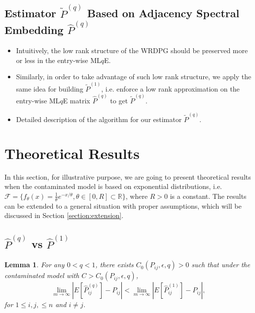 \documentclass[a4paper]{article}
\newtheorem{lemma}[fact]{Lemma}
\renewcommand{\hat}{\widehat}
\begin{document}
\subsection{Estimator $\widetilde{P}^{(q)}$ Based on Adjacency Spectral Embedding $\hat{P}^{(q)}$}
\begin{itemize}
\item Intuitively, the low rank structure of the WRDPG should be preserved more or less in the entry-wise ML$q$E.
\item Similarly, in order to take advantage of such low rank structure, we apply the same idea for building $\widetilde{P}^{(1)}$, i.e. enforce a low rank approximation on the entry-wise ML$q$E matrix $\hat{P}^{(q)}$ to get $\widetilde{P}^{(q)}$.
\item Detailed description of the algorithm for our estimator $\widetilde{P}^{(q)}$.
\end{itemize}





\section{Theoretical Results}
\label{section:theory}
In this section, for illustrative purpose, we are going to present theoretical results when the contaminated model is based on exponential distributions, i.e. $\mathcal{F} = \{ f_{\theta}(x) = \frac{1}{\theta} e^{-x/\theta}, \theta \in [0, R] \subset \mathbb{R} \}$, where $R > 0$ is a constant. The results can be extended to a general situation with proper assumptions, which will be discussed in Section \ref{section:extension}.

\subsection{$\hat{P}^{(q)}$ vs $\hat{P}^{(1)}$}
\begin{lemma}
\label{lemma:ELqlEMLE}
For any $0 < q < 1$, there exists $C_0(P_{ij}, \epsilon, q) > 0$ such that under the contaminated model with $C > C_0(P_{ij}, \epsilon, q)$,
\[
	\lim_{m \to \infty} \left| E[\hat{P}^{(q)}_{ij}] - P_{ij} \right| < 
    \lim_{m \to \infty} \left| E[\hat{P}^{(1)}_{ij}] - P_{ij} \right|,
\]
for $1 \le i, j, \le n$ and $i \ne j$.
\end{lemma}
\end{document}
